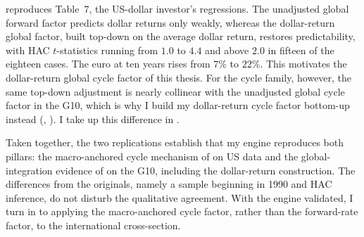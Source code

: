  reproduces Table~7, the US-dollar investor's regressions. The
unadjusted global forward factor predicts dollar returns only weakly, whereas the
dollar-return global factor, built top-down on the average dollar return, restores
predictability, with HAC $t$-statistics running from $1.0$ to $4.4$ and above
$2.0$ in fifteen of the eighteen cases. The euro at ten years rises from
$7\%$ to $22\%$. This motivates the dollar-return global cycle factor of
this thesis. For the cycle family, however, the same top-down adjustment is nearly
collinear with the unadjusted global cycle factor in the G10, which is why I
build my dollar-return cycle factor bottom-up instead (,
). I take up this difference in
.

\begin{table}[t]
  \caption{US-dollar excess returns on the global and dollar-return factors (DH Table~7)}
  \label{tab:dh-t7}
  \centering
  
\end{table}

Taken together, the two replications establish that my engine reproduces both
pillars: the macro-anchored cycle mechanism of \citet{cieslak2015} on US data
and the global-integration evidence of \citet{dahlquist2013} on the G10,
including the dollar-return construction. The differences from the originals, namely a
sample beginning in 1990 and HAC inference, do not disturb the qualitative agreement. With the engine
validated, I turn in  to applying the macro-anchored cycle
factor, rather than the forward-rate factor, to the international cross-section.
